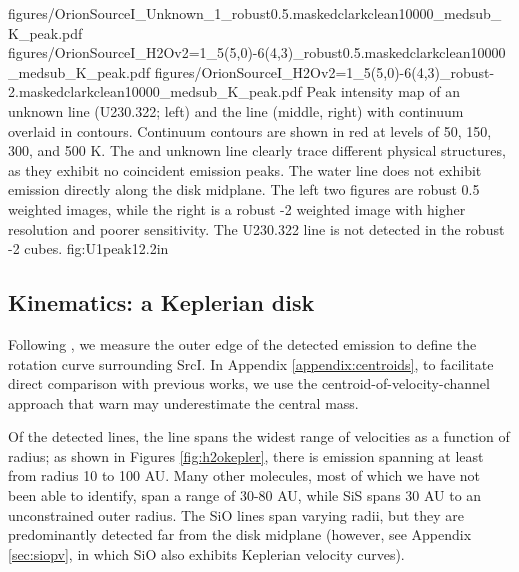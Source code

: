 \documentclass[twocolumn]{aastex61}
\newcommand{\sourcei}{SrcI}
\begin{document}






\FigureThree
{{figures/OrionSourceI_Unknown_1_robust0.5.maskedclarkclean10000_medsub_K_peak}.pdf}
{{figures/OrionSourceI_H2Ov2=1_5(5,0)-6(4,3)_robust0.5.maskedclarkclean10000_medsub_K_peak}.pdf}
{{figures/OrionSourceI_H2Ov2=1_5(5,0)-6(4,3)_robust-2.maskedclarkclean10000_medsub_K_peak}.pdf}
{Peak intensity map of an unknown line (U230.322; left) and the \water
line (middle, right) with continuum overlaid
in contours.
Continuum contours are shown in red at levels of 
50, 150, 300, and 500 K. %
The \water and unknown line clearly trace different physical structures, as
they exhibit no coincident emission peaks.  The water line does
not exhibit emission directly along the disk midplane.
The left two figures are robust 0.5 weighted images, while the right
is a robust -2 weighted image with higher resolution and poorer
sensitivity.  The U230.322 line is not detected in the robust -2 cubes.
}
{fig:U1peak}{1}{2.2in}


\subsection{Kinematics: a Keplerian disk}
\label{sec:kinematics}
Following \citet{Seifried2016a}, we measure the outer edge of the detected
\water emission to define the rotation curve surrounding \sourcei.  In Appendix
\ref{appendix:centroids}, to facilitate direct comparison with previous works,
we use the centroid-of-velocity-channel approach that \citet{Seifried2016a}
warn may underestimate the central mass.

Of the detected lines, the \water line spans the widest range of
velocities as a function of radius; as shown in Figures \ref{fig:h2okepler},
there is \water emission spanning at least from radius 10 to 100 AU.  Many
other molecules, most of
which we have not been able to identify, span a range of 30-80 AU, while SiS
spans 30 AU to an unconstrained outer radius.   The SiO lines span varying radii,
but they are predominantly detected far from the disk midplane (however,
see Appendix \ref{sec:siopv}, in which SiO also exhibits Keplerian velocity
curves).
\end{document}
